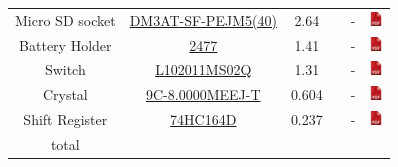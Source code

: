 \documentclass[12pt,a4paper,landscape]{article}
\begin{document}
{\begin{tabular}{|c|c|c|c|c|c|}
					Micro SD socket &
					\href{http://fr.farnell.com/hirose-hrs/dm3at-sf-pejm5-40/connecteur-micro-sd-push-push/dp/1764374}
					{DM3AT-SF-PEJM5(40)} & 2.64 & &
					- &
					\href{http://www.farnell.com/datasheets/1697167.pdf}{\includegraphics[height=1em]{pdf.png}}\\
					    
					Battery Holder &
					\href{http://fr.farnell.com/keystone/2477/battery-holder-pcb/dp/1650684}
					{2477} & 1.41 & &
					- &
					\href{http://www.farnell.com/datasheets/1703957.pdf}{\includegraphics[height=1em]{pdf.png}}\\
					    
					Switch &
					\href{http://fr.farnell.com/c-k-components/l102011ms02q/commutateur-lateral-spdt/dp/2435160}
					{L102011MS02Q} & 1.31 & &
					- &
					\href{http://www.farnell.com/datasheets/1839859.pdf}{\includegraphics[height=1em]{pdf.png}}\\

					Crystal &
					\href{http://fr.farnell.com/txc/9c-8-000meej-t/xtal-8-000mhz-18pf-smd-hc-49s/dp/1842347}
					{9C-8.0000MEEJ-T} & 0.604 & &
					- &
					\href{http://www.farnell.com/datasheets/1497895.pdf}{\includegraphics[height=1em]{pdf.png}}\\
					    
					Shift Register &
					\href{http://fr.farnell.com/nexperia/74hc164d/circuit-logique-serie-74hc-cms/dp/1085337?st=registre}
					{74HC164D} & 0.237 & &
					- &
					\href{http://www.farnell.com/datasheets/2000344.pdf}{\includegraphics[height=1em]{pdf.png}}\\
					    
					\hline
					total & & & & &\\
					\hline
				\end{tabular}
			}
\end{document}
